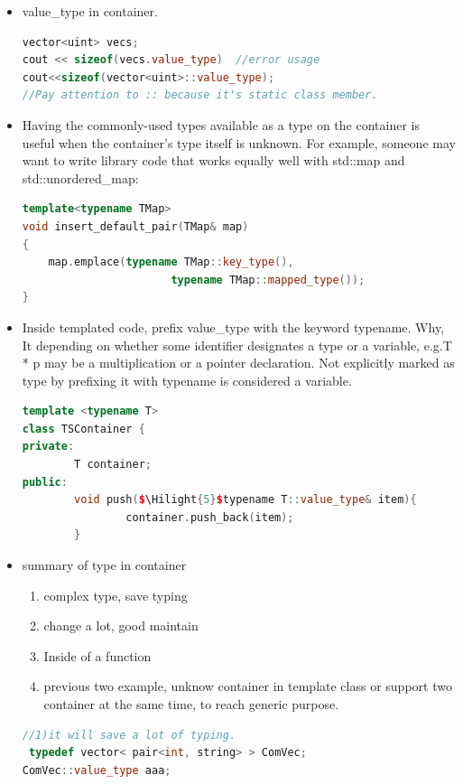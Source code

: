 \documentclass[a4paper,11pt,twoside]{book}
\newcommand{\Hilight}[1]{\makebox[0pt][l]{\color{yellow}\rule[-3pt]{#1em}{11pt}}}
\newcommand{\Hilight}[1]{}
\begin{document}
\begin{itemize}
\item value\_type in container.
\begin{lstlisting}[frame=single, language=c++]
vector<uint> vecs;
cout << sizeof(vecs.value_type)  //error usage
cout<<sizeof(vector<uint>::value_type);
//Pay attention to :: because it's static class member.
\end{lstlisting}

\item Having the commonly-used types available as a type on the container is useful when the container's type itself is unknown. For example, someone may want to write library code that works equally well with std::map and std::unordered\_map:
\begin{lstlisting}[frame=single, language=c++]
template<typename TMap>
void insert_default_pair(TMap& map)
{
    map.emplace(typename TMap::key_type(),
                       typename TMap::mapped_type());
}
\end{lstlisting}

\item Inside templated code, prefix value\_type with the keyword typename. Why, It depending on whether some identifier designates a type or a variable, e.g.T * p may be a multiplication or a pointer declaration. Not explicitly marked as type by prefixing it with typename is considered a variable.

\begin{lstlisting}[frame=single, language=c++, mathescape=true]
template <typename T>
class TSContainer {
private:
        T container;
public:
        void push($\Hilight{5}$typename T::value_type& item){
                container.push_back(item);
        }
\end{lstlisting}


\item summary of type in container
\begin{enumerate}
\item complex type, save typing
\item change a lot, good maintain
\item Inside of a function
\item previous two example, unknow container in template class or support two container at the same time, to reach generic purpose.
\end{enumerate}
\begin{lstlisting}[frame=single, language=c++, mathescape=true]
//1)it will save a lot of typing.
 typedef vector< pair<int, string> > ComVec;
ComVec::value_type aaa;


\end{lstlisting}
\end{itemize}
\end{document}
